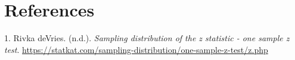 \documentclass[
]{article}
\newlength{\cslhangindent}
\newlength{\cslentryspacingunit} %
\newenvironment{CSLReferences}[2] %
 {%
  \setlength{\parindent}{0pt}
  \ifodd #1
  \let\oldpar\par
  \def\par{\hangindent=\cslhangindent\oldpar}
  \fi
  \setlength{\parskip}{#2\cslentryspacingunit}
 }%
 {}
\begin{document}
\hypertarget{references}{%
\section*{References}\label{references}}

\hypertarget{refs}{}
\begin{CSLReferences}{1}{0}
\leavevmode{}%
1. Rivka deVries. (n.d.). \emph{Sampling distribution of the z statistic - one sample z test}. \url{https://statkat.com/sampling-distribution/one-sample-z-test/z.php}

\end{CSLReferences}
\end{document}
